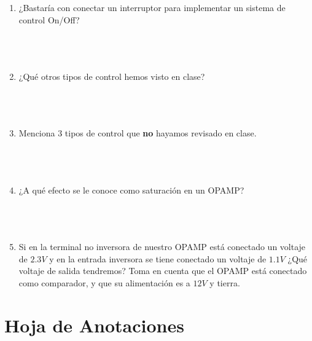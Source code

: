 	\begin{enumerate}
		\item ¿Bastaría con conectar un interruptor para implementar un sistema de control On/Off?\\ \\ \\ \\
		\item ¿Qué otros tipos de control hemos visto en clase?\\ \\ \\ \\
		\item Menciona 3 tipos de control que {\bf no} hayamos revisado en clase.\\ \\ \\ \\
		\item ¿A qué efecto se le conoce como saturación en un OPAMP?\\ \\ \\ \\
		\item Si en la terminal no inversora de nuestro OPAMP está conectado un voltaje de $2.3 V$ y en la entrada inversora se tiene conectado un voltaje de $1.1 V$ ¿Qué voltaje de salida tendremos? Toma en cuenta que el OPAMP está conectado como comparador, y que su alimentación es a $12 V$ y tierra.\\
	\end{enumerate}


\clearpage
\section{Hoja de Anotaciones}

